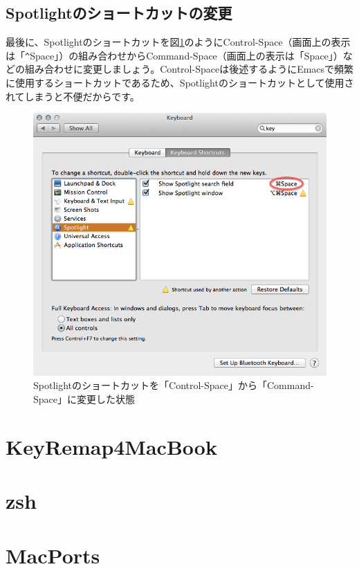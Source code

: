 \subsection{Spotlightのショートカットの変更}
最後に、Spotlightのショートカットを図\ref{fig_Keyboard3_png}のようにControl-Space（画面上の表示は「\verb|^|Space」）の組み合わせからCommand-Space（画面上の表示は「Space」）などの組み合わせに変更しましょう。Control-Spaceは後述するようにEmacsで頻繁に使用するショートカットであるため、Spotlightのショートカットとして使用されてしまうと不便だからです。

\begin{figure}
  \begin{center}
    \includegraphics[scale=0.4,bb= 0 0 668 636]{fig/Keyboard3.png}
    \caption{Spotlightのショートカットを「Control-Space」から「Command-Space」に変更した状態}
    \label{fig_Keyboard3_png}
  \end{center}
\end{figure}

\section{KeyRemap4MacBook}

\section{zsh}
\section{MacPorts}
